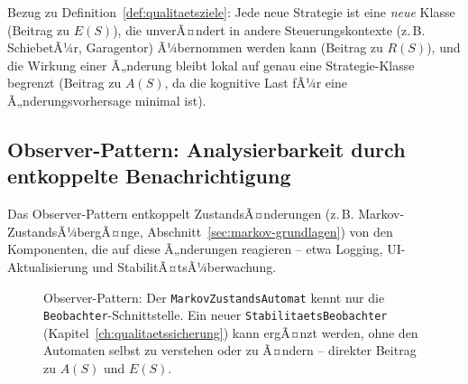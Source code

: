 ﻿\documentclass[a4paper,12pt]{report}
\theoremstyle{definition}
\begin{document}
\noindent
Bezug zu Definition~\ref{def:qualitaetsziele}: Jede neue Strategie ist eine
\emph{neue} Klasse (Beitrag zu $E(S)$), die unverÃ¤ndert in andere
Steuerungskontexte (z.\,B. SchiebetÃ¼r, Garagentor) Ã¼bernommen werden kann
(Beitrag zu $R(S)$), und die Wirkung einer Ã„nderung bleibt lokal auf genau eine
Strategie-Klasse begrenzt (Beitrag zu $A(S)$, da die kognitive Last fÃ¼r eine
Ã„nderungsvorhersage minimal ist).

\subsection{Observer-Pattern: Analysierbarkeit durch entkoppelte Benachrichtigung}

Das Observer-Pattern entkoppelt ZustandsÃ¤nderungen (z.\,B. Markov-ZustandsÃ¼bergÃ¤nge,
Abschnitt~\ref{sec:markov-grundlagen}) von den Komponenten, die auf diese
Ã„nderungen reagieren -- etwa Logging, UI-Aktualisierung und
StabilitÃ¤tsÃ¼berwachung.

\begin{figure}[H]
\centering
{}
\caption{Observer-Pattern: Der \texttt{MarkovZustandsAutomat} kennt nur die
\texttt{Beobachter}-Schnittstelle. Ein neuer \texttt{StabilitaetsBeobachter}
(Kapitel~\ref{ch:qualitaetssicherung}) kann ergÃ¤nzt werden, ohne den Automaten
selbst zu verstehen oder zu Ã¤ndern -- direkter Beitrag zu $A(S)$ und $E(S)$.}
\label{fig:observer-pattern}
\end{figure}
\end{document}
